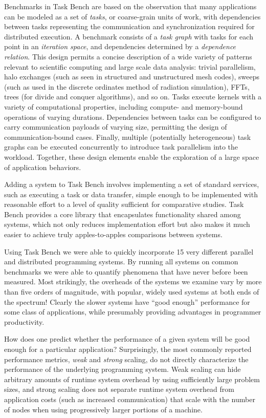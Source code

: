 Benchmarks in Task Bench are based on the observation that many applications can be modeled
as a set of \emph{tasks}, or coarse-grain units of work, with
dependencies between tasks representing the communication and synchronization required for
distributed execution. A benchmark consists of a \emph{task graph} with tasks for
each point in an \emph{iteration space}, and dependencies
determined by a \emph{dependence relation}. This design permits a
concise description of a wide variety of patterns relevant to
scientific computing and large scale data analysis: trivial parallelism, halo exchanges (such as
seen in structured and unstructured mesh codes), sweeps (such as used
in the discrete ordinates method of radiation simulation), FFTs, trees
(for divide and conquer algorithms), and so on. Tasks execute kernels with a
variety of computational properties, including compute- and
memory-bound operations of varying durations. Dependencies between
tasks can be configured to carry communication payloads of varying size, permitting
the design of communication-bound cases. Finally, multiple
(potentially heterogeneous) task graphs can be executed concurrently
to introduce task parallelism into the workload. Together, these
design elements enable the exploration of a large space of application
behaviors.

Adding a system to Task Bench involves  implementing a set of standard
services, such as executing a task or data transfer, simple enough to 
be implemented with reasonable effort to a level of quality sufficient for comparative
studies. Task Bench provides a core library that encapsulates functionality
shared among systems, which not only reduces implementation effort
but also makes it much easier to achieve truly apples-to-apples comparisons
between systems.

Using Task Bench we were able to quickly incorporate 15 very different parallel and distributed
programming systems.  By running all systems on common benchmarks we were able to quantify phenomena
that have never before been measured.
Most strikingly, the overheads of the systems we examine vary by more than five orders
of magnitude, with popular, widely used systems at both ends of the spectrum!  Clearly
the slower systems have ``good enough'' performance for some class of applications, while presumably
providing advantages in programmer productivity.

How does one predict whether the performance of a given
system will be good enough for a particular application?
Surprisingly, the most commonly reported performance metrics,
\emph{weak} and \emph{strong} scaling, do not directly characterize
the performance of the underlying
programming system. Weak scaling can hide arbitrary amounts of runtime
system overhead by using sufficiently large problem sizes, and strong
scaling does not separate runtime system overhead from application costs
(such as increased communication) that scale with the number of nodes when
using progressively larger portions of a machine. 

